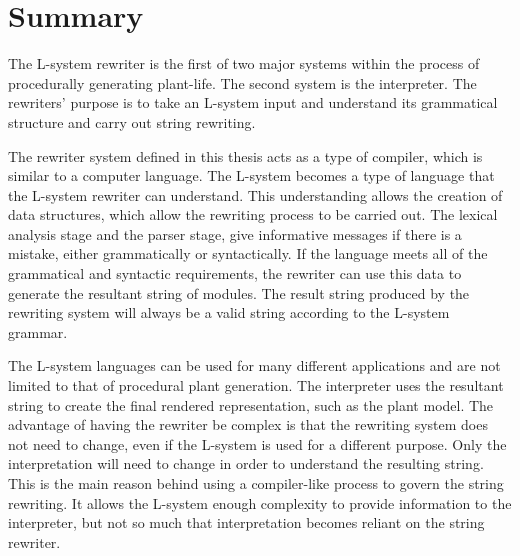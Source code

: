 \newpage
\section{Summary}

The L-system rewriter is the first of two major systems within the process of procedurally generating plant-life. The second system is the interpreter. The rewriters' purpose is to take an L-system input and understand its grammatical structure and carry out string rewriting.

The rewriter system defined in this thesis acts as a type of compiler, which is similar to a computer language. The L-system becomes a type of language that the L-system rewriter can understand. This understanding allows the creation of data structures, which allow the rewriting process to be carried out. The lexical analysis stage and the parser stage, give informative messages if there is a mistake, either grammatically or syntactically. If the language meets all of the grammatical and syntactic requirements, the rewriter can use this data to generate the resultant string of modules. The result string produced by the rewriting system will always be a valid string according to the L-system grammar. 

The L-system languages can be used for many different applications and are not limited to that of procedural plant generation. The interpreter uses the resultant string to create the final rendered representation, such as the plant model. The advantage of having the rewriter be complex is that the rewriting system does not need to change, even if the L-system is used for a different purpose.  Only the interpretation will need to change in order to understand the resulting string. This is the main reason behind using a compiler-like process to govern the string rewriting. It allows the L-system enough complexity to provide information to the interpreter, but not so much that interpretation becomes reliant on the string rewriter.
